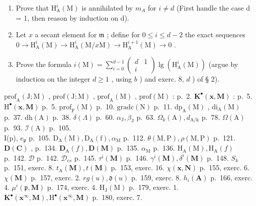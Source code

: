 \begin{enumerate}
\def\labelenumi{\alph{enumi})}
\item
  Prove that \(\mathrm{H}_{\mathrm{A}}^{i}(\mathrm{M})\) is annihilated by \(m_{A}\) for \(i \neq d\) (First handle the case d = 1, then reason by induction on d).
\item
  Let \(x\) a secant element for \(\mathfrak{m}\) ; define for \(0 \leqslant i \leqslant d - 2\) the exact sequences \(0 \to \mathrm{H}_{\mathrm{A}}^{i}(\mathrm{M}) \to \mathrm{H}_{\mathrm{A}}^{i}(\mathrm{M}/x\mathrm{M}) \to \mathrm{H}_{\mathrm{A}}^{i+1}(\mathrm{M}) \to 0\) .
\item
  Prove the formula \(i(\mathrm{M}) = \sum_{i=0}^{d-1} \left( \begin{array}{cc} d & 1 \\ i & \end{array} \right) \lg(\mathrm{H}_{\mathrm{A}}^i(\mathrm{M}))\) (argue by induction on the integer \(d \geqslant 1\) , using \(b\) ) and exerc. 8, \(d\) ) of § 2).
\end{enumerate}


\(\mathrm{prof}_{\mathrm{A}}(\mathrm{J};\mathrm{M})\) , \(\mathrm{prof}(\mathrm{J};\mathrm{M})\) , \(\mathrm{prof}_{\mathrm{A}}(\mathrm{M})\) , \(\mathrm{prof}(\mathrm{M})\) : p.~2. \(\mathbf{K}^{\bullet}(\mathbf{x},\mathbf{M})\) : p.~5. \(\mathrm{H}^{\bullet}(\mathbf{x},\mathbf{M})\) p.~5. \(\mathrm{prof}_{\mathrm{F}}(\mathrm{M})\) p.~10. \(\mathrm{gradc}(\mathrm{N})\) p.~11. \(\mathrm{dp}_{\mathrm{A}}(\mathrm{M})\) , \(\mathrm{di}_{\mathrm{A}}(\mathrm{M})\) p.~37. \(\mathrm{dh(A)}\) p.~38. \(\delta (\Lambda)\) p.~60. \(\alpha_{\mathrm{J}},\beta_{\mathrm{J}}\) p.~63. \(\Omega_k(\mathrm{A}),d_{\mathrm{A / k}}\) p.~78. \(\Omega (\mathrm{A})\) p.~93. \(\mathcal{I}(\mathrm{A})\) p.~105.\\
I(p), \(e_{\mathfrak{p}}\) p.~105. \(\mathrm{D_A(M),D_A(f),}\alpha_{\mathrm{M}}\) p.~112. \(\theta (\mathrm{M},\mathrm{P}),\rho (\mathrm{M},\mathrm{P})\) p.~121. \(\mathbf{D}(\mathbf{C})\) , p.~134. \(\mathbf{D}_{\mathrm{A}}(f),\mathbf{D}(\mathbf{M})\) p.~135. \(\alpha_{\mathrm{M}}\) p.~136. \(\mathrm{H}_{\mathrm{A}}(\mathrm{M}),\mathrm{H}_{\mathrm{A}}(f)\) p.~142. \(\mathcal{D}\) p.~142. \(\mathcal{D}_{cs}\) p.~145. \(\tau^i (\mathbf{M})\) p.~146. \(\gamma^i (\mathbf{M}),\delta^i (\mathbf{M})\) p.~148. \(S_{k}\) p.~151, exerc. 8. \(t_\mathrm{A}(\mathbf{M}),t(\mathbf{M})\) p.~153, exerc. 16. \(\chi (\mathbf{x},\mathbf{N})\) p.~155, exerc. 6. \(\chi (\mathbf{M})\) p.~157, exerc. 2. \(rg(u),\mathfrak{d}(u)\) p.~159, exerc. 8. \(h_i(\mathbf{A})\) p.~166, exerc. 4. \(\mu^i (\mathfrak{p},\mathbf{M})\) p.~174, exerc. 4. \(\mathrm{H}_{\mathrm{J}}(\mathrm{M})\) p.~179, exerc. 1. \(\mathbf{K}^{\bullet}(\mathbf{x}^{\infty},\mathbf{M}),\mathrm{H}^{\bullet}(\mathbf{x}^{\infty},\mathbf{M})\) p.~180, exerc. 7.

